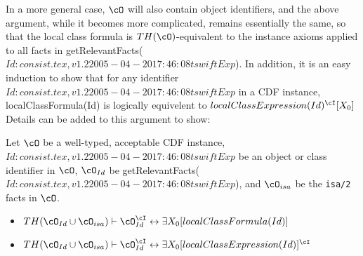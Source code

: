 In a more general case, $\cO$ will also contain object identifiers,
and the above argument, while it becomes more complicated, remains
essentially the same, so that the local class formula is
$TH(\cO)$-equivalent to the instance axioms applied to all facts in
{\sf getRelevantFacts($Id: consist.tex,v 1.2 2005-04-20 17:46:08 tswift Exp $)}.  In addition, it is an easy induction to
show that for any identifier $Id: consist.tex,v 1.2 2005-04-20 17:46:08 tswift Exp $ in a CDF instance, {\sc
localClassFormula(Id)} is logically equivelent to
$localClassExpression(Id)^{\cI}[X_0]$
%
%
Details can be added to this argument to show: 

\begin{lemma} \label{lem:localce}
Let $\cO$ be a well-typed, acceptable CDF instance, $Id: consist.tex,v 1.2 2005-04-20 17:46:08 tswift Exp $ be an object
or class identifier in $\cO$, $\cO_{Id}$ be {\sf
getRelevantFacts($Id: consist.tex,v 1.2 2005-04-20 17:46:08 tswift Exp $)}, and $\cO_{isa}$ be the {\tt isa/2} facts
in $\cO$.
\begin{itemize}
\item $TH(\cO_{Id} \cup \cO_{isa}) \vdash \cO_{Id}^{\cI}
\leftrightarrow \exists X_0 [localClassFormula(Id)] $
\item 
$TH(\cO_{Id} \cup \cO_{isa}) \vdash \cO_{Id}^{\cI}
\leftrightarrow \exists X_0[localClassExpression(Id)]^{\cI}$
\end{itemize}
\end{lemma}

